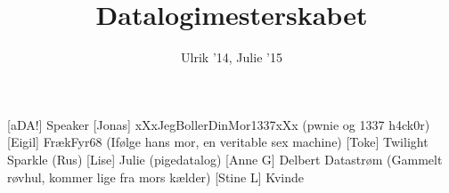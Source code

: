 \documentclass[a4paper,11pt]{article}
\title{Datalogimesterskabet}
\author{Ulrik '14, Julie '15}
\begin{document}
\maketitle

\begin{roles}
[aDA!] Speaker
[Jonas] xXxJegBollerDinMor1337xXx (pwnie og 1337 h4ck0r)
[Eigil] FrækFyr68 (Ifølge hans mor, en veritable sex machine)
[Toke] Twilight Sparkle (Rus)
[Lise] Julie (pigedatalog)
[Anne G] Delbert Datastrøm (Gammelt røvhul, kommer lige fra mors kælder)
[Stine L] Kvinde
\end{roles}

\end{document}
